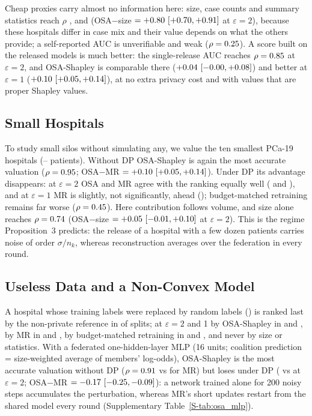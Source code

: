 Cheap proxies carry almost no information here: size, case counts and summary statistics reach $\rho$ \pxLSizeNoDP, \pxLPosNoDP{} and \pxLStatNoDP{} (OSA$-$size $=+0.80\ [+0.70, +0.91]$ at $\varepsilon=2$), because these hospitals differ in case mix and their value depends on what the others provide; a self-reported AUC is unverifiable and weak ($\rho=0.25$). A score built on the released models is much better: the single-release AUC reaches $\rho=0.85$ at $\varepsilon=2$, and OSA-Shapley is comparable there ($+0.04\ [-0.00, +0.08]$) and better at $\varepsilon=1$ ($+0.10\ [+0.05, +0.14]$), at no extra privacy cost and with values that are proper Shapley values. 



\subsection{Small Hospitals}
To study small silos without simulating any, we value the ten smallest PCa-19 hospitals (\pxSmallMin--\pxSmallMax{} patients). Without DP OSA-Shapley is again the most accurate valuation ($\rho=0.95$; OSA$-$MR $=+0.10\ [+0.05, +0.14]$). Under DP its advantage disappears: at $\varepsilon=2$ OSA and MR agree with the ranking equally well (\pxSOsaTwo{} and \pxSMrTwo), and at $\varepsilon=1$ MR is slightly, not significantly, ahead (\pxdSMrOne); budget-matched retraining remains far worse ($\rho=0.45$). Here contribution follows volume, and size alone reaches $\rho=0.74$ (OSA$-$size $=+0.05\ [-0.01, +0.10]$ at $\varepsilon=2$). This is the regime Proposition~3 predicts: the release of a hospital with a few dozen patients carries noise of order $\sigma/n_k$, whereas reconstruction averages over the federation in every round.

\subsection{Useless Data and a Non-Convex Model}
\label{sec:p19_robust}
\label{sec:p19_small}
\label{sec:p19_mlp}
A hospital whose training labels were replaced by random labels (\corrHosp) is ranked last by the non-private reference in \corrTruth{} of splits; at $\varepsilon=2$ and 1 by OSA-Shapley in \corrOsaTwo{} and \corrOsaOne, by MR in \corrMrTwo{} and \corrMrOne, by budget-matched retraining in \corrBmTwo{} and \corrBmOne, and never by size or statistics. With a federated one-hidden-layer MLP (16 units; coalition prediction = size-weighted average of members' log-odds), OSA-Shapley is the most accurate valuation without DP ($\rho=0.91$ vs \mlpMrNoDP{} for MR) but loses under DP (\mlpOsaTwo{} vs \mlpMrTwo{} at $\varepsilon=2$; OSA$-$MR $=-0.17\ [-0.25, -0.09]$): a network trained alone for 200 noisy steps accumulates the perturbation, whereas MR's short updates restart from the shared model every round (Supplementary Table~\ref{S-tab:osa_mlp}).

